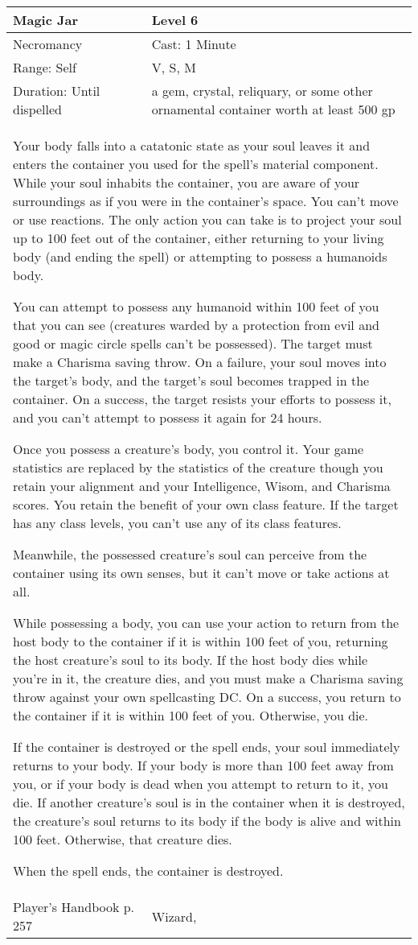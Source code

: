 \documentclass[11pt]{report}
\begin{document}
\begin{table}[H]
	\begin{tabular}{||p{6cm}|p{6cm}||}
		\hline\hline
		\bf{Magic Jar} & Level 6\\ \hline
		Necromancy & Cast: 1 Minute\\ \hline
		Range: Self & V, S, M\\ \hline
		Duration: Until dispelled & a gem, crystal, reliquary, or some other ornamental container worth at least 500 gp\\ \hline
		\multicolumn{2}{||p{12cm}||}{Your body falls into a catatonic state as your soul leaves it and enters the container you used for the spell’s material component. While your soul inhabits the container, you are aware of your surroundings as if you were in the container’s space. You can’t move or use reactions. The only action you can take is to project your soul up to 100 feet out of the container, either returning to your living body (and ending the spell) or attempting to possess a humanoids body.

You can attempt to possess any humanoid within 100 feet of you that you can see (creatures warded by a protection from evil and good or magic circle spells can’t be possessed). The target must make a Charisma saving throw. On a failure, your soul moves into the target’s body, and the target’s soul becomes trapped in the container. On a success, the target resists your efforts to possess it, and you can’t attempt to possess it again for 24 hours.

Once you possess a creature’s body, you control it. Your game statistics are replaced by the statistics of the creature though you retain your alignment and your Intelligence, Wisom, and Charisma scores. You retain the benefit of your own class feature. If the target has any class levels, you can’t use any of its class features.

Meanwhile, the possessed creature’s soul can perceive from the container using its own senses, but it can’t move or take actions at all.

While possessing a body, you can use your action to return from the host body to the container if it is within 100 feet of you, returning the host creature’s soul to its body. If the host body dies while you’re in it, the creature dies, and you must make a Charisma saving throw against your own spellcasting DC. On a success, you return to the container if it is within 100 feet of you. Otherwise, you die.

If the container is destroyed or the spell ends, your soul immediately returns to your body. If your body is more than 100 feet away from you, or if your body is dead when you attempt to return to it, you die. If another creature’s soul is in the container when it is destroyed, the creature’s soul returns to its body if the body is alive and within 100 feet. Otherwise, that creature dies.

When the spell ends, the container is destroyed.}\\ \hline
Player's Handbook p. 257 & Wizard, \\ \hline\hline
	\end{tabular}
\end{table}
\end{document}
